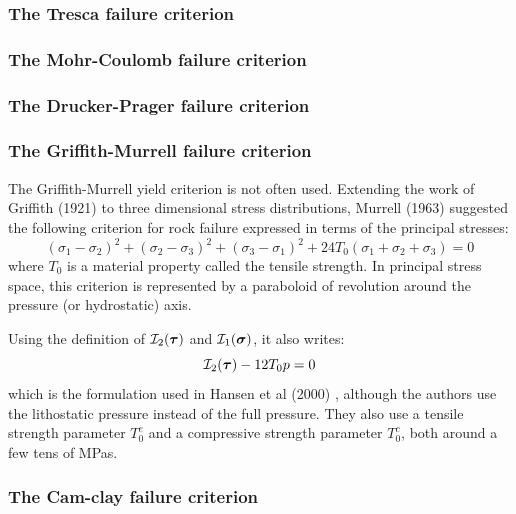 \subsubsection{The Tresca failure criterion}


\subsubsection{The Mohr-Coulomb failure criterion}


\subsubsection{The Drucker-Prager failure criterion}


\subsubsection{The Griffith-Murrell failure criterion}

The Griffith-Murrell yield criterion \cite{brau94,brbe95,babr97} is not often used. 
Extending the work of Griffith (1921) to three dimensional stress distributions, 
Murrell (1963) suggested the following criterion for rock failure expressed 
in terms of the principal stresses:
\[
(\sigma_1-\sigma_2)^2 + (\sigma_2-\sigma_3)^2 + (\sigma_3-\sigma_1)^2
+
24T_0 (\sigma_1+\sigma_2+\sigma_3)=0
\]
where $T_0$ is a material property called the tensile strength. In principal stress space, 
this criterion is represented by a paraboloid of revolution around the pressure (or hydrostatic) axis.

Using the definition of ${\cal I}_2({\bm \tau})$ and ${\cal I}_1({\bm \sigma})$, it also writes:
\[
{\cal I}_2({\bm \tau}) - 12 T_0 p =0
\]
which is the formulation used in Hansen et al (2000) \cite{hanl00}, although the authors
use the lithostatic pressure instead of the full pressure. They also use a tensile 
strength parameter $T_0^e$ and a compressive strength parameter $T_0^c$, both around a few tens 
of MPas.

\subsubsection{The Cam-clay failure criterion}

